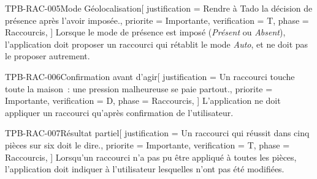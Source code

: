 \begin{exigence}{TPB-RAC-005}{Mode Géolocalisation}[
    justification = {Rendre à Tado la décision de présence après l'avoir imposée.},
    priorite      = {Importante},
    verification  = {T},
    phase         = {Raccourcis},
  ]
  Lorsque le mode de présence est imposé (\emph{Présent} ou \emph{Absent}), l'application
  doit proposer un raccourci qui rétablit le mode \emph{Auto}, et ne doit pas le proposer
  autrement.
\end{exigence}

\begin{exigence}{TPB-RAC-006}{Confirmation avant d'agir}[
    justification = {Un raccourci touche toute la maison~: une pression malheureuse se paie
                     partout.},
    priorite      = {Importante},
    verification  = {D},
    phase         = {Raccourcis},
  ]
  L'application ne doit appliquer un raccourci qu'après confirmation de l'utilisateur.
\end{exigence}

\begin{exigence}{TPB-RAC-007}{Résultat partiel}[
    justification = {Un raccourci qui réussit dans cinq pièces sur six doit le dire.},
    priorite      = {Importante},
    verification  = {T},
    phase         = {Raccourcis},
  ]
  Lorsqu'un raccourci n'a pas pu être appliqué à toutes les pièces, l'application doit
  indiquer à l'utilisateur lesquelles n'ont pas été modifiées.
\end{exigence}

